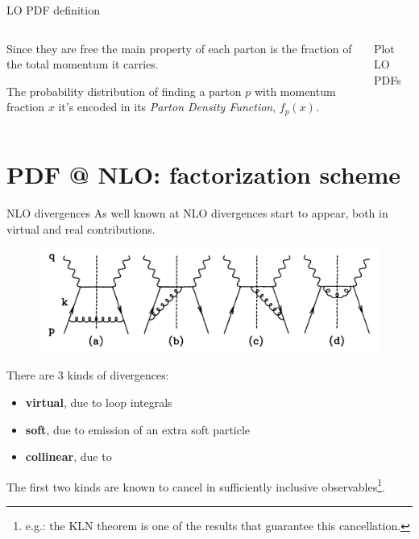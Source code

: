 \documentclass[9pt]{beamer}
\begin{document}
\begin{frame}{LO PDF definition}
    \begin{columns}
        \begin{column}{0.55\textwidth}
            Since they are free the main property of each parton is the
            fraction of the total momentum it carries.\newline

            The probability distribution of finding a parton $p$ with momentum
            fraction $x$ it's encoded in its \textit{Parton Density Function}\footnotemark,
            $f_p(x)$.
        \end{column}
        \begin{column}{0.45\textwidth}
            Plot LO PDFs

        \end{column}
    \end{columns}
\end{frame}

\section{PDF @ NLO: factorization scheme}
\begin{frame}{NLO divergences}
    As well known at NLO divergences start to appear, both in virtual and real contributions.
    \begin{figure}
        \centering
        \includegraphics[width=.8\textwidth]{pictures/nlo-real}
    \end{figure}
    There are 3 kinds of divergences:
    \begin{itemize}
        \item \textbf{virtual}, due to loop integrals
        \item \textbf{soft}, due to emission of an extra soft particle
        \item \textbf{collinear}, due to
    \end{itemize}
    The first two kinds are known to cancel in sufficiently inclusive
    observables\footnote{e.g.: the KLN theorem is one of the results that guarantee
    this cancellation.}.
\end{frame}
\end{document}
